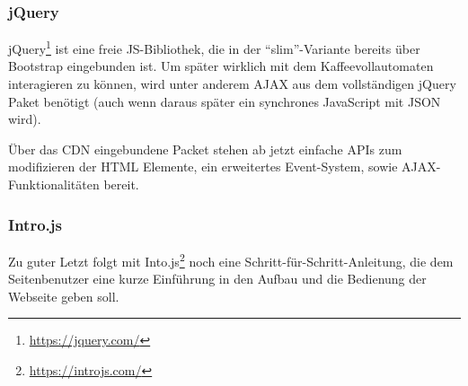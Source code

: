 \subsubsection{jQuery}
jQuery\footnote{\url{https://jquery.com/}} ist eine freie \acl{JS}-Bibliothek, die in der "`slim"'-Variante bereits über Bootstrap eingebunden ist.
Um später wirklich mit dem Kaffeevollautomaten interagieren zu können, wird unter anderem \acs{AJAX} aus dem vollständigen jQuery Paket benötigt (auch wenn daraus später ein synchrones JavaScript mit \acs{JSON} wird).

Über das \acs{CDN} eingebundene Packet stehen ab jetzt einfache \aclp{API} zum modifizieren der \acs{HTML} Elemente, ein erweitertes Event-System, sowie \acs{AJAX}-Funktionalitäten bereit.

\subsubsection{Intro.js}
Zu guter Letzt folgt mit Into.js\footnote{\url{https://introjs.com/}} noch eine Schritt-für-Schritt-Anleitung, die dem Seitenbenutzer eine kurze Einführung in den Aufbau und die Bedienung der Webseite geben soll.
